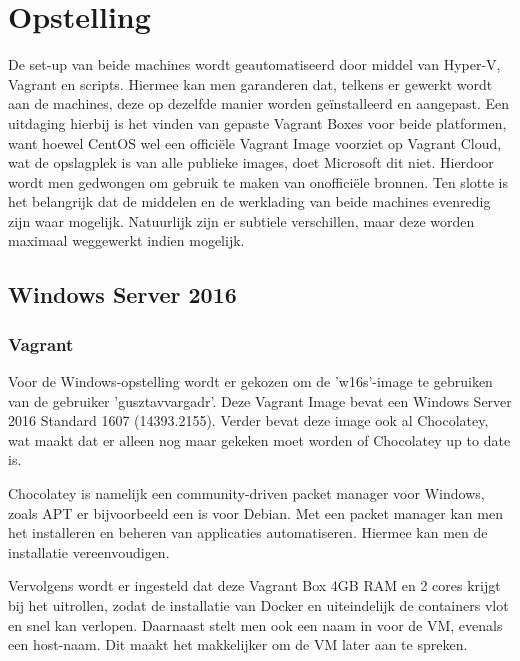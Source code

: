 
\chapter{Opstelling}
\label{ch:opstelling}

De set-up van beide machines wordt geautomatiseerd door middel van Hyper-V, Vagrant en scripts. Hiermee kan men garanderen dat, telkens er gewerkt wordt aan de machines, deze op dezelfde manier worden geïnstalleerd en aangepast.
Een uitdaging hierbij is het vinden van gepaste Vagrant Boxes voor beide platformen, want hoewel CentOS wel een officiële Vagrant Image voorziet op Vagrant Cloud, wat de opslagplek is van alle publieke images, doet Microsoft dit niet. Hierdoor wordt men gedwongen om gebruik te maken van onofficiële bronnen.
Ten slotte is het belangrijk dat de middelen en de werklading van beide machines evenredig zijn waar mogelijk. Natuurlijk zijn er subtiele verschillen, maar deze worden maximaal weggewerkt indien mogelijk. 

\section{Windows Server 2016}


\subsection{Vagrant}
Voor de Windows-opstelling wordt er gekozen om de 'w16s'-image te gebruiken van de gebruiker 'gusztavvargadr'. Deze Vagrant Image bevat een Windows Server 2016 Standard 1607 (14393.2155). Verder bevat deze image ook al Chocolatey, wat maakt dat er alleen nog maar gekeken moet worden of Chocolatey up to date is.

Chocolatey is namelijk een community-driven packet manager voor Windows, zoals APT er bijvoorbeeld een is voor Debian. Met een packet manager kan men het installeren en beheren van applicaties automatiseren. Hiermee kan men de installatie vereenvoudigen.

Vervolgens wordt er ingesteld dat deze Vagrant Box 4GB RAM en 2 cores krijgt bij het uitrollen, zodat de installatie van Docker en uiteindelijk de containers vlot en snel kan verlopen. Daarnaast stelt men ook een naam in voor de VM, evenals een host-naam. Dit maakt het makkelijker om de VM later aan te spreken.

